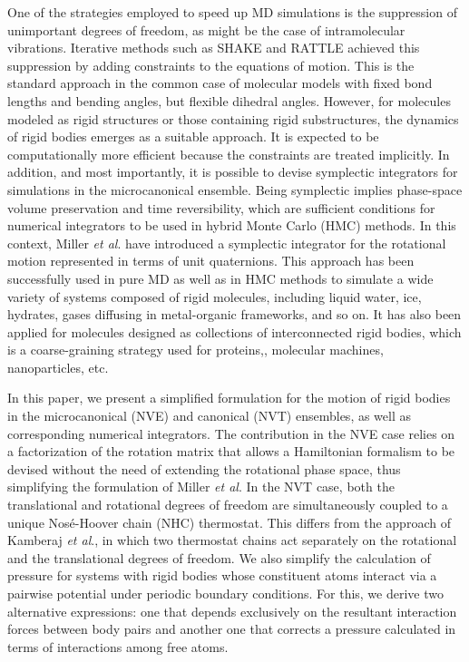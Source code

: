 \documentclass[aip,jcp,reprint,amsmath,amssymb]{revtex4-1}
\begin{document}
One of the strategies employed to speed up MD simulations is the suppression of unimportant degrees of freedom, as might be the case of intramolecular vibrations. Iterative methods such as SHAKE\cite{Ryckaert1977} and RATTLE\cite{Andersen1983} achieved this suppression by adding constraints to the equations of motion. This is the standard approach in the common case of molecular models with fixed bond lengths and bending angles, but flexible dihedral angles. However, for molecules modeled as rigid structures or those containing rigid substructures,\cite{Miller2002} the dynamics of rigid bodies emerges as a suitable approach. It is expected to be computationally more efficient because the constraints are treated implicitly. In addition, and most importantly, it is possible to devise symplectic integrators for simulations in the microcanonical ensemble. Being symplectic implies phase-space volume preservation and time reversibility, which are sufficient conditions for numerical integrators to be used in hybrid Monte Carlo (HMC) methods.\cite{Duane1987} In this context, Miller \textit{et al}.\cite{Miller2002} have introduced a symplectic integrator for the rotational motion represented in terms of unit quaternions. This approach has been successfully used in pure MD as well as in HMC methods to simulate a wide variety of systems composed of rigid molecules, including liquid water,\cite{Sakamaki2011, Reinhardt2012, Palmer2014, Gonzales2014} ice,\cite{Geiger2014} hydrates,\cite{Tribello2009, Gorman2012} gases diffusing in metal-organic frameworks,\cite{Ghoufi2010} and so on. It has also been applied for molecules designed as collections of interconnected rigid bodies, which is a coarse-graining strategy used for proteins,\cite{Terada2003}, molecular machines,\cite{Akimov2008, Konyukhov2010} nanoparticles,\cite{Knorowski2012, Patra2013} etc.

In this paper, we present a simplified formulation for the motion of rigid bodies in the microcanonical (NVE) and canonical (NVT) ensembles, as well as corresponding numerical integrators. The contribution in the NVE case relies on a factorization of the rotation matrix that allows a Hamiltonian formalism to be devised without the need of extending the rotational phase space, thus simplifying the formulation of Miller \textit{et al}.\cite{Miller2002} In the NVT case, both the translational and rotational degrees of freedom are simultaneously coupled to a unique Nos\'{e}-Hoover chain (NHC) thermostat. This differs from the approach of Kamberaj \textit{et al}.,\cite{Kamberaj2005} in which two thermostat chains act separately on the rotational and the translational degrees of freedom. We also simplify the calculation of pressure for systems with rigid bodies whose constituent atoms interact via a pairwise potential under periodic boundary conditions. For this, we derive two alternative expressions: one that depends exclusively on the resultant interaction forces between body pairs and another one that corrects a pressure calculated in terms of interactions among free atoms.
\end{document}
